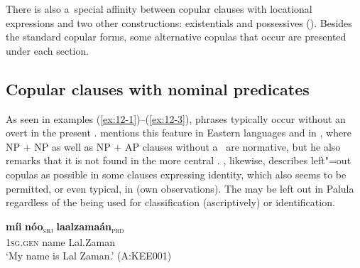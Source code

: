 

There is also a~special affinity between copular clauses with locational expressions and two other constructions: existentials and possessives (). Besides the standard copular forms, some alternative copulas that occur are presented under each section.


\subsection{Copular clauses with nominal predicates}
\label{subsec:12-1-1}


As seen in examples (\ref{ex:12-1})--(\ref{ex:12-3}),   phrases typically occur without an overt  in the present . \citet[337]{masica1991} mentions this feature in Eastern \iliNIA languages and in \iliSinhalese, where NP + NP as well as NP + AP clauses without a~ are normative, but he also remarks that it is not found in the more central \iliUrduHindi. \citet[118--122]{baart1999a}, likewise, describes left"=out copulas as possible in some \iliGawri clauses expressing identity, which also seems to be permitted, or even typical, in \iliKhowar (own observations). The  may be left out in Palula regardless of the  being used for classification (ascriptively) or identification. 

\ea
\label{ex:12-1}
\gll {\ob}\textbf{míi} \textbf{nóo}{\cb}\textsubscript{\textsc{\upshape sbj}} {\ob}\textbf{laalzamaán}{\cb}\textsubscript{\textsc{\upshape prd}}\\
\textsc{1sg.gen} name Lal.Zaman\\
\glt `My name is Lal Zaman.' (A:KEE001)

